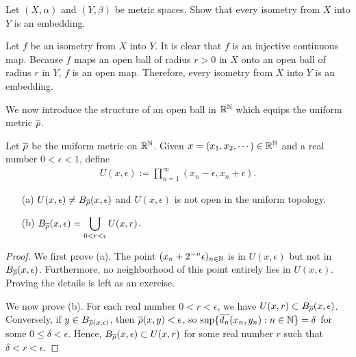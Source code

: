 \begin{prob}
    Let $(X, \alpha)$ and $(Y, \beta)$ be metric spaces.
    Show that every isometry from $X$ into $Y$ is an embedding.
\end{prob}
\begin{sol}
    Let $f$ be an isometry from $X$ into $Y$.
    It is clear that $f$ is an injective continuous map.
    Because $f$ maps an open ball of radius $r>0$ in $X$ onto an open ball of radius $r$ in $Y$, $f$ is an open map.
    Therefore, every isometry from $X$ into $Y$ is an embedding.
\end{sol}

We now introduce the structure of an open ball in ${\mathbb{R}}^{\mathbb{N}}$ which equips the uniform metric $\overline{\rho}$.
\begin{prop}
    Let $\overline{\rho}$ be the uniform metric on ${\mathbb{R}}^{\mathbb{N}}$.
    Given $x=(x_1, x_2, \cdots)\in{\mathbb{R}}^{\mathbb{N}}$ and a real number $0<\epsilon<1$, define
    \begin{align*}
        U(x, \epsilon):=\prod_{n=1}^\infty (x_n-\epsilon, x_n+\epsilon).
    \end{align*}
    \begin{enumerate}
        \item[(a)] $U(x, \epsilon)\neq B_{\overline{\rho}}(x, \epsilon)$ and $U(x, \epsilon)$ is not open in the uniform topology.
        \item[(b)] $\displaystyle{B_{\overline{\rho}}(x, \epsilon)=\bigcup_{0<r<\epsilon} U(x, r)}$.
    \end{enumerate}
\end{prop}
\begin{proof}
    We first prove (a).
    The point $(x_n+2^{-n}\epsilon)_{n\in{\mathbb{N}}}$ is in $U(x, \epsilon)$ but not in $B_{\overline{\rho}}(x, \epsilon)$.
    Furthermore, no neighborhood of this point entirely lies in $U(x, \epsilon)$.
    Proving the details is left as an exercise.
    
    We now prove (b).
    For each real number $0<r<\epsilon$, we have $U(x, r)\subset B_{\overline{\rho}}(x, \epsilon)$.
    Conversely, if $y\in B_{\overline{\rho}(x, \epsilon)}$, then $\overline{\rho}(x, y)<\epsilon$, so $\sup\{\overline{d_n}(x_n, y_n): n\in{\mathbb{N}}\}=\delta$ for some $0\leq\delta<\epsilon$.
    Hence, $B_{\overline{\rho}}(x, \epsilon)\subset U(x, r)$ for some real number $r$ such that $\delta<r<\epsilon$.
\end{proof}